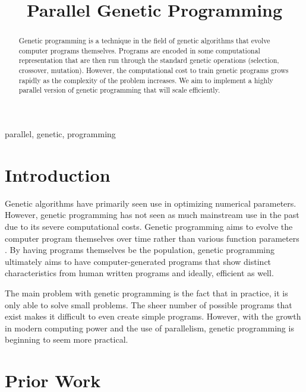 \documentclass[conference]{IEEEtran}
\begin{document}
	
	\title{Parallel Genetic Programming
	}
	
	\author{

		\and

	}
	
	\maketitle
	
	\begin{abstract}
Genetic programming is a technique in the field of genetic algorithms that evolve computer programs themselves. Programs are encoded in some computational representation that are then run through the standard genetic operations (selection, crossover, mutation). However, the computational cost to train genetic programs grows rapidly as the complexity of the problem increases. We aim to implement a highly parallel version of genetic programming that will scale efficiently.
	\end{abstract}
	
	\begin{IEEEkeywords}
		parallel, genetic, programming
	\end{IEEEkeywords}
	
	\section{Introduction}
	Genetic algorithms have primarily seen use in optimizing numerical parameters. However, genetic programming has not seen as much mainstream use in the past due to its severe computational costs. Genetic programming aims to evolve the computer program themselves over time rather than various function parameters \cite{b1}. By having programs themselves be the population, genetic programming ultimately aims to have computer-generated programs that show distinct characteristics from human written programs and ideally, efficient as well.
	
	The main problem with genetic programming is the fact that in practice, it is only able to solve small problems. The sheer number of possible programs that exist makes it difficult to even create simple programs. However, with the growth in modern computing power and the use of parallelism, genetic programming is beginning to seem more practical.
	
	\section{Prior Work}
	
\end{document}
